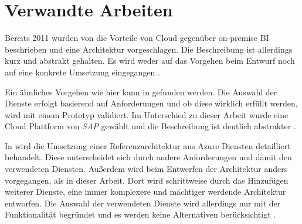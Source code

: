 \section{Verwandte Arbeiten} \label{ch:verwandteArbeiten}
Bereits 2011 wurden von \citeauthor{ouf_cloud_2011} die Vorteile von Cloud gegenüber on-premise BI beschrieben und eine Architektur vorgeschlagen. Die Beschreibung ist allerdings kurz und abstrakt gehalten. Es wird weder auf das Vorgehen beim Entwurf noch auf eine konkrete Umsetzung eingegangen \cite[vgl.][]{ouf_cloud_2011}.

Ein ähnliches Vorgehen wie hier kann in  gefunden werden. Die Auswahl der Dienste erfolgt basierend auf Anforderungen und ob diese wirklich erfüllt werden, wird mit einem Prototyp validiert. Im Unterschied zu dieser Arbeit wurde eine Cloud Plattform von \textit{SAP} gewählt und die Beschreibung ist deutlich abstrakter \cite[vgl.][]{oliver_norkus_rabic_2016}.

In  wird die Umsetzung einer Referenzarchitektur aus Azure Diensten detailliert behandelt. Diese unterscheidet sich durch andere Anforderungen und damit den verwendeten Diensten. Außerdem wird beim Entwerfen der Architektur anders vorgegangen, als in dieser Arbeit. Dort wird schrittweise durch das Hinzufügen weiterer Dienste, eine immer komplexere und mächtiger werdende Architektur entworfen. Die Auswahl der verwendeten Dienste wird allerdings nur mit der Funktionalität begründet und es werden keine Alternativen berücksichtigt \cite[vgl.][]{borosch_cloud_2021}.